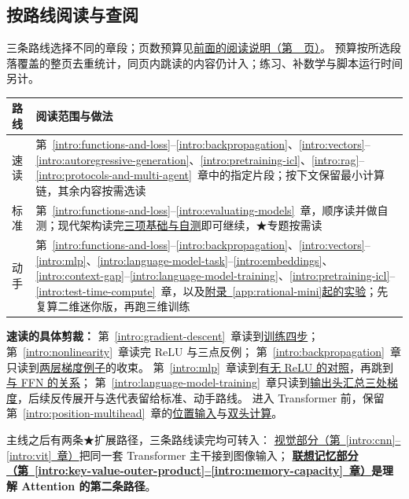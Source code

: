 \subsection{按路线阅读与查阅}
\label{app:reading-details}
\begingroup\small
\newcommand{\routech}[1]{\ref*{intro:#1}}
三条路线选择不同的章段；页数预算见\hyperref[front:reading-routes]{前面的阅读说明（第~\pageref*{front:reading-routes}~页）}。
预算按所选段落覆盖的整页去重统计，同页内跳读的内容仍计入；练习、补数学与脚本运行时间另计。

\noindent\begin{tabularx}{\linewidth}{@{}p{15mm}X@{}}
\toprule
路线 & 阅读范围与做法\\\midrule
速读 & 第~\routech{functions-and-loss}--\routech{backpropagation}、\routech{vectors}--\routech{autoregressive-generation}、\routech{pretraining-icl}、\routech{rag}--\routech{protocols-and-multi-agent}~章中的指定片段；按下文保留最小计算链，其余内容按需选读\\
标准 & 第~\routech{functions-and-loss}--\routech{evaluating-models}~章，顺序读并做自测；现代架构读完\hyperref[sec:modern-core-comparison]{三项基础与自测}即可继续，{\symboliconfont ★}专题按需读\\
动手 & 第~\routech{functions-and-loss}--\routech{backpropagation}、\routech{vectors}--\routech{mlp}、\routech{language-model-task}--\routech{embeddings}、\routech{context-gap}--\routech{language-model-training}、\routech{pretraining-icl}--\routech{test-time-compute}~章，以及\hyperref[app:rational-mini]{附录~\ref*{app:rational-mini}起的实验}；先复算二维迷你版，再跑三维训练\\
\bottomrule
\end{tabularx}\par\smallskip
\textbf{速读的具体剪裁：}
第~\routech{gradient-descent}~章读到\hyperref[intro:training-four-steps]{训练四步}；
第~\routech{nonlinearity}~章读完 ReLU 与三点反例；
第~\routech{backpropagation}~章只读到\hyperref[sec:backprop-weight-gradients]{两层梯度例子}的收束。
第~\routech{mlp}~章读到\hyperref[sec:mlp-nonlinearity]{有无 ReLU 的对照}，再跳到\hyperref[sec:mlp-ffn]{与 FFN 的关系}；
第~\routech{language-model-training}~章只读到\hyperref[sec:transformer-gradient-step]{输出头汇总三处梯度}，后续反传展开与迭代表留给标准、动手路线。
进入 Transformer 前，保留第~\routech{position-multihead}~章的\hyperref[sec:position-input]{位置输入}与\hyperref[concept:multihead]{双头计算}。\par
主线之后有两条{\symboliconfont ★}扩展路径，三条路线读完均可转入：
\hyperref[part:vision]{视觉部分（第~\routech{cnn}--\routech{vit}~章）}把同一套 Transformer 主干接到图像输入；
\textbf{\hyperref[part:memory]{联想记忆部分（第~\ref*{intro:key-value-outer-product}--\ref*{intro:memory-capacity}~章）}是理解 Attention 的第二条路径}。



